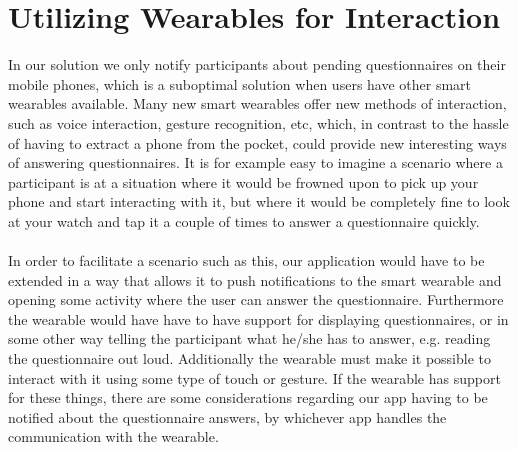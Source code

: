 
\section{Utilizing Wearables for Interaction}
\label{sec:utilizing_wearables_for_interaction}

In our solution we only notify participants about pending questionnaires on their mobile phones, which is a suboptimal solution when users have other smart wearables available. Many new smart wearables offer new methods of interaction, such as voice interaction, gesture recognition, etc, which, in contrast to the hassle of having to extract a phone from the pocket, could provide new interesting ways of answering questionnaires. It is for example easy to imagine a scenario where a participant is at a situation where it would be frowned upon to pick up your phone and start interacting with it, but where it would be completely fine to look at your watch and tap it a couple of times to answer a questionnaire quickly. 
\\\\
In order to facilitate a scenario such as this, our application would have to be extended in a way that allows it to push notifications to the smart wearable and opening some activity where the user can answer the questionnaire. Furthermore the wearable would have have to have support for displaying questionnaires, or in some other way telling the participant what he/she has to answer, e.g. reading the questionnaire out loud. Additionally the wearable must make it possible to interact with it using some type of touch or gesture. If the wearable has support for these things, there are some considerations regarding our app having to be notified about the questionnaire answers, by whichever app handles the communication with the wearable. 